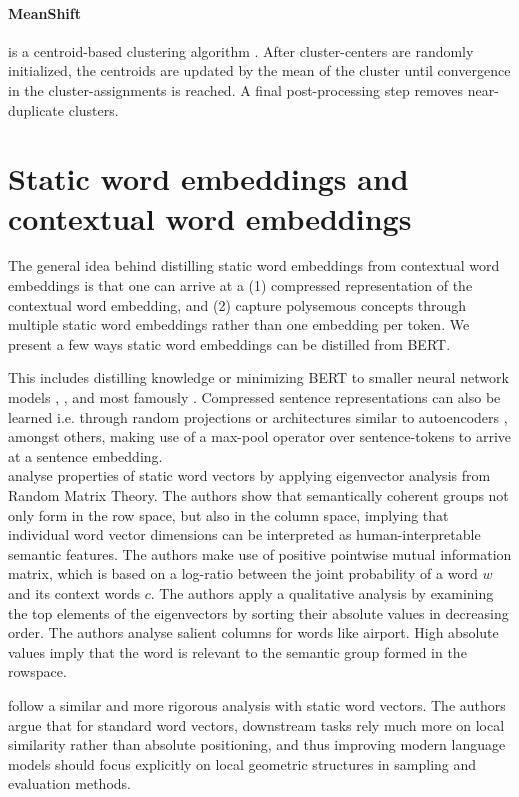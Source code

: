 \documentclass[a4paper,12pt,oneside,openright]{report}
\begin{document}
\paragraph{MeanShift} is a centroid-based clustering algorithm \cite{comaniciu02}.
After cluster-centers are randomly initialized, the centroids are updated by the mean of the cluster until convergence in the cluster-assignments is reached.
A final post-processing step removes near-duplicate clusters.


\section{Static word embeddings and contextual word embeddings}

The general idea behind distilling static word embeddings from contextual word embeddings is that one can arrive at a (1) compressed representation of the contextual word embedding, and (2) capture polysemous concepts through multiple static word embeddings rather than one embedding per token. 
We present a few ways static word embeddings can be distilled from BERT.

This includes  distilling knowledge or minimizing BERT to smaller neural network models \cite{tang19}, \cite{tsai19}, and most famously \cite{sanh19}.
Compressed sentence representations can also be learned i.e. through random projections or architectures similar to autoencoders \cite{shen19}, amongst others, making use of a max-pool operator over sentence-tokens to arrive at a sentence embedding. \\

\cite{shin18} analyse properties of static word vectors by applying eigenvector analysis from Random Matrix Theory.
The authors show that semantically coherent groups not only form in the row space, but also in the column space, implying that individual word vector dimensions can be interpreted as human-interpretable semantic features.
The authors make use of positive pointwise mutual information matrix, which is based on a log-ratio between the joint probability of a word $w$ and its context words $c$.
The authors apply a qualitative analysis by examining the top elements of the eigenvectors by sorting their absolute values in decreasing order.
The authors analyse salient columns for words like airport.
High absolute values imply that the word is relevant to the semantic group formed in the rowspace.

\cite{whitaker19} follow a similar and more rigorous analysis with static word vectors. 
The authors argue that for standard word vectors, downstream tasks rely much more on local similarity rather than absolute positioning, and thus improving modern language models should focus explicitly on local geometric structures in sampling and evaluation methods.
\end{document}
